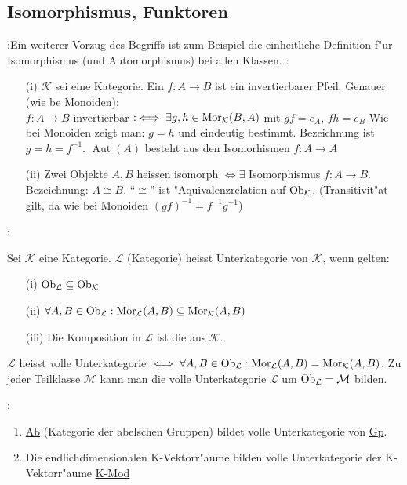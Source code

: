 \subsection{Isomorphismus, Funktoren}
\remark{}:{Ein weiterer Vorzug des Begriffs ist zum Beispiel die 
einheitliche Definition f"ur Isomorphismus (und Automorphismus)
bei allen Klassen.}
:{\begin{enumerate}
\item[(i)] $\mathcal{K}$ sei eine Kategorie. Ein  $f:A\longrightarrow B$
ist ein invertierbarer Pfeil. Genauer (wie be Monoiden):\\
$f:A\longrightarrow B$ invertierbar $:\iff \exists g,h\in \Mor(K;B;A)$
mit $gf=e_A$, $fh=e_B$
Wie bei Monoiden zeigt man: $g=h$  und eindeutig bestimmt. Bezeichnung ist
$g=h=f^{-1}$.
$\operatorname{Aut}(A)$ besteht aus den Isomorhismen $f:A\longrightarrow A$
\item[(ii)] Zwei Objekte $A,B$ heissen isomorph $\iff \exists$
Isomorphismus $f:A\longrightarrow B$. Bezeichnung: $A\cong B$.
``$\cong$'' ist "Aquivalenzrelation auf $\operatorname{Ob}_{\mathcal{K}}$. (Transitivit"at gilt, da
wie bei Monoiden $(gf)^{-1}=f^{-1}g^{-1}$)
\end{enumerate}}
:{Sei $\mathcal{K}$ eine Kategorie.
$\mathcal{L}$ (Kategorie) heisst Unterkategorie von $\mathcal{K}$, wenn gelten:
\begin{enumerate}
\item[(i)] $\operatorname{Ob}_{\mathcal{L}} \subseteq \operatorname{Ob}_{\mathcal{K}}$
\item[(ii)] $\forall A,B\in \Ob{L}: \Mor(L;A;B)\subseteq \Mor(K;A;B)$
\item[(iii)] Die Komposition in $\mathcal{L}$ ist die aus $\mathcal{K}$.
\end{enumerate}
$\mathcal{L}$ heisst {\emph volle} Unterkategorie
$\iff \forall A,B \in \Ob{L}: \Mor(L;A;B)=\Mor(K;A;B)$.
Zu jeder Teilklasse $\mathcal{M}$ kann man die volle Unterkategorie
$\mathcal{L}$ um $\operatorname{Ob}_{\mathcal{L}}=\mathcal{M}$ bilden.
}
\example{}:{\begin{enumerate}
\item \underline{Ab} (Kategorie der abelschen Gruppen) bildet volle
Unterkategorie von \underline{Gp}.
\item Die endlichdimensionalen K-Vektorr"aume bilden volle Unterkategorie
der K-Vektorr"aume \underline{K-Mod}
\end{enumerate}}
